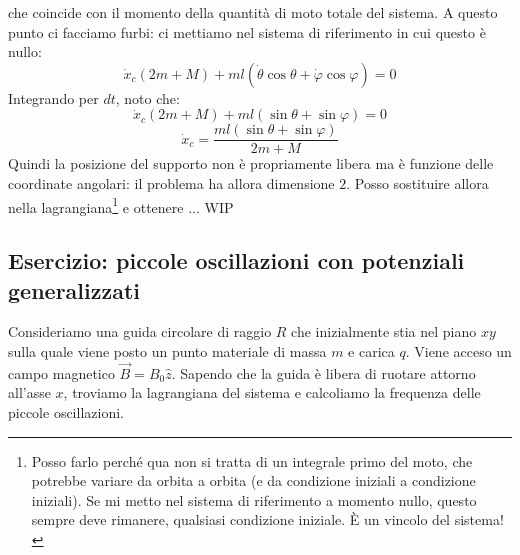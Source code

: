 \documentclass[a4paper,openany]{article}
\begin{document}
che coincide con il momento della quantità di moto totale del sistema. A questo punto ci facciamo furbi: ci mettiamo nel sistema di riferimento in cui questo è nullo: 
$$
\dot{x}_c(2m+M) + ml(\dot\theta\cos\theta+\dot\varphi\cos\varphi)=0
$$
Integrando per $dt$, noto che:
$$
\dot{x}_c(2m+M) + ml(\sin\theta+\sin\varphi) =0
$$
$$
\dot{x}_c = \dfrac{ml(\sin\theta+\sin\varphi) }{2m+M}
$$
Quindi la posizione del supporto non è propriamente libera ma è funzione delle coordinate angolari: il problema ha allora dimensione $2$. Posso sostituire allora nella lagrangiana\footnote{Posso farlo perché qua non si tratta di un integrale primo del moto, che potrebbe variare da orbita a orbita (e da condizione iniziali a condizione iniziali). Se mi metto nel sistema di riferimento a momento nullo, questo sempre deve rimanere, qualsiasi condizione iniziale. È un vincolo del sistema!} e ottenere ... 	WIP
\subsection{Esercizio: piccole oscillazioni con potenziali generalizzati}
	Consideriamo una guida circolare di raggio $R$ che inizialmente stia nel piano $xy$ sulla quale viene posto un punto materiale di massa $m$ e carica $q$. Viene acceso un campo magnetico $\vec{B} = B_0\hat{z}$. Sapendo che la guida è libera di ruotare attorno all'asse $x$, troviamo la lagrangiana del sistema e calcoliamo la frequenza delle piccole oscillazioni. 
	
\end{document}
